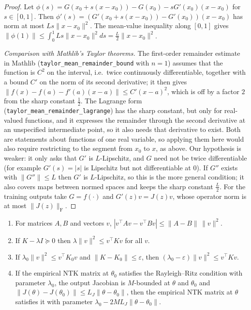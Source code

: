 \begin{proof}
  \leanok
Let $\phi(s)=G(x_0+s(x-x_0))-G(x_0)-sG'(x_0)(x-x_0)$ for $s\in[0,1]$. Then $\phi'(s)=(G'(x_0+s(x-x_0))-G'(x_0))(x-x_0)$ has norm at most $Ls\|x-x_0\|^2$. The mean-value
inequality along $[0,1]$ gives $\|\phi(1)\|\le\int_0^1Ls\|x-x_0\|^2ds=\frac L2\|x-x_0\|^2$.

\emph{Comparison with Mathlib's Taylor theorems.} The first-order remainder estimate in Mathlib (\texttt{taylor\_mean\_remainder\_bound} with $n=1$) assumes that the function is $C^2$ on the interval, i.e.\ twice continuously differentiable, together with a bound $C'$ on the norm of its second derivative; it then gives $\|f(x)-f(a)-f'(a)(x-a)\|\le C'(x-a)^2$, which is off by a factor $2$ from the sharp constant $\tfrac12$.
The Lagrange form (\texttt{taylor\_mean\_remainder\_lagrange}) has the sharp constant, but only for real-valued functions, and it expresses the remainder through the second derivative at an unspecified intermediate point, so it also needs that derivative to exist. Both are statements about functions of one real variable, so applying them here would also require restricting to the segment from $x_0$ to $x$, as above.
Our hypothesis is weaker: it only asks that $G'$ is $L$-Lipschitz, and $G$ need not be twice differentiable (for example $G'(s)=|s|$ is Lipschitz but not differentiable at $0$). If $G''$ exists with $\|G''\|\le L$ then $G'$ is $L$-Lipschitz, so this is the more general condition; it also covers maps between normed spaces and keeps the sharp constant $\tfrac L2$.
For the training outputs take $G=f(\cdot)$ and $G'(z)v=J(z)v$, whose operator norm is at most $\|J(z)\|_{\mathrm F}$.
\end{proof}

\begin{theorem}\label{thm:ntkgf:rayleighStability}
  \leanok
\begin{enumerate}
  \item For matrices $A,B$ and vectors $v$, $|v^\top Av-v^\top Bv|\le\|A-B\|\,\|v\|^2$.
  \item If $K-\lambda I\succeq0$ then $\lambda\|v\|^2\le v^\top Kv$ for all $v$.
  \item If $\lambda_0\|v\|^2\le v^\top K_0v$ and $\|K-K_0\|\le\varepsilon$, then $(\lambda_0-\varepsilon)\|v\|^2\le v^\top Kv$.
  \item If the empirical NTK matrix at $\theta_0$ satisfies the Rayleigh--Ritz condition with parameter $\lambda_0$, the output Jacobian is $M$-bounded at $\theta$ and $\theta_0$ and
        $\|J(\theta)-J(\theta_0)\|\le L_J\|\theta-\theta_0\|$, then the empirical NTK matrix at $\theta$ satisfies it with parameter
        $\lambda_0-2ML_J\|\theta-\theta_0\|$.
\end{enumerate}
\end{theorem}


